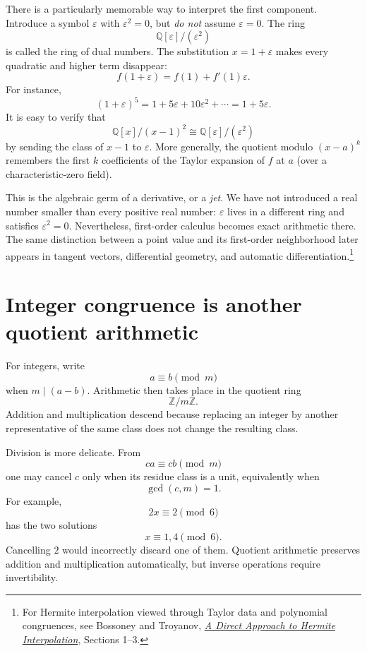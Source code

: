 There is a particularly memorable way to interpret the first component. Introduce a symbol $\varepsilon$ with $\varepsilon^2=0$, but \emph{do not} assume $\varepsilon=0$. The ring
\[
 \mathbb Q[\varepsilon]/(\varepsilon^2)
\]
is called the ring of dual numbers. The substitution $x=1+\varepsilon$ makes every quadratic and higher term disappear:
\[
 f(1+\varepsilon)=f(1)+f'(1)\varepsilon.
\]
For instance,
\[
 (1+\varepsilon)^5
 =1+5\varepsilon+10\varepsilon^2+\cdots
 =1+5\varepsilon.
\]
It is easy to verify that
\[
 \mathbb Q[x]/(x-1)^2
 \cong\mathbb Q[\varepsilon]/(\varepsilon^2)
\]
by sending the class of $x-1$ to $\varepsilon$. More generally, the quotient modulo $(x-a)^k$ remembers the first $k$ coefficients of the Taylor expansion of $f$ at $a$ (over a characteristic-zero field).

This is the algebraic germ of a derivative, or a \emph{jet}. We have not introduced a real number smaller than every positive real number: $\varepsilon$ lives in a different ring and satisfies $\varepsilon^2=0$. Nevertheless, first-order calculus becomes exact arithmetic there. The same distinction between a point value and its first-order neighborhood later appears in tangent vectors, differential geometry, and automatic differentiation.\footnote{For Hermite interpolation viewed through Taylor data and polynomial congruences, see Bossoney and Troyanov, \href{https://arxiv.org/html/2607.17998v3}{\emph{A Direct Approach to Hermite Interpolation}}, Sections 1--3.}

\section{Integer congruence is another quotient arithmetic}

For integers, write
\[
  a\equiv b\pmod m
\]
when \(m\mid(a-b)\).  Arithmetic then takes place in the quotient ring
\[
  \mathbb Z/m\mathbb Z.
\]
Addition and multiplication descend because replacing an integer by another representative of the same class does not change the resulting class.

Division is more delicate.  From
\[
  ca\equiv cb\pmod m
\]
one may cancel \(c\) only when its residue class is a unit, equivalently when
\[
  \gcd(c,m)=1.
\]
For example,
\[
  2x\equiv2\pmod6
\]
has the two solutions
\[
  x\equiv1,4\pmod6.
\]
Cancelling \(2\) would incorrectly discard one of them.  Quotient arithmetic preserves addition and multiplication automatically, but inverse operations require invertibility.

